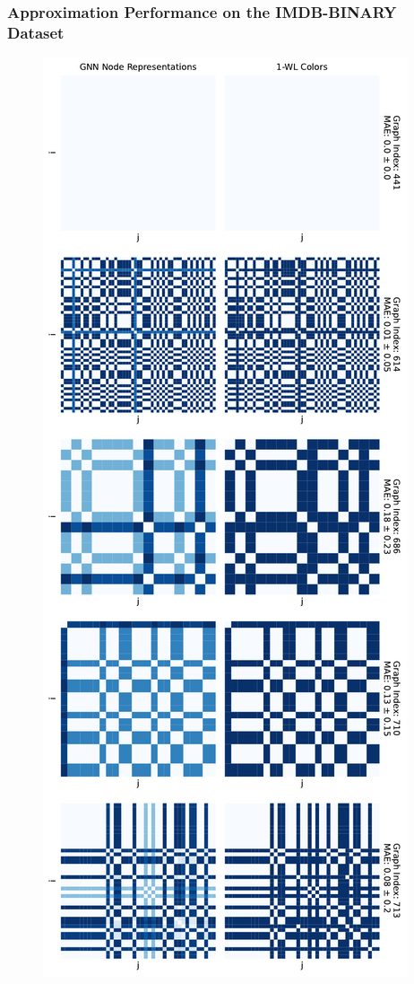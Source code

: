 \subsubsection{\gnn Approximation Performance on the IMDB-BINARY Dataset}
\begin{figure}[H]
    \centering
    \begin{minipage}[b]{0.45992852703\textwidth}
        \centering
        \includegraphics[width=\textwidth, left]{Figures/heatmaps_IMDB-BINARY_0.pdf}

\end{minipage}
\end{figure}
